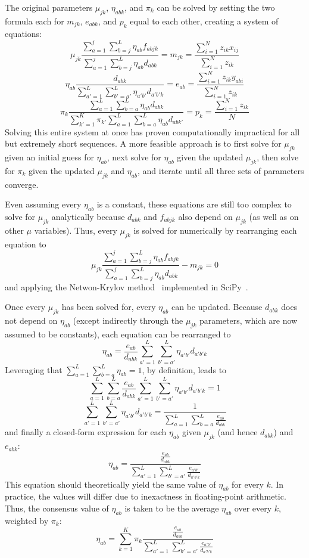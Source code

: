 \documentclass[../../MainTexts/main.tex]{subfiles}
\begin{document}
The original parameters $\mu_{jk}$, $\eta_{abk}$, and $\pi_k$ can be solved by setting the two formula each for $m_{jk}$, $e_{abk}$, and $p_k$ equal to each other, creating a system of equations:
$$\mu_{jk} \frac{\sum_{a=1}^{j}\sum_{b=j}^{L}\eta_{ab} f_{abjk}}{\sum_{a=1}^{j}\sum_{b=j}^{L}\eta_{ab}d_{abk}} = m_{jk} = \frac{\sum_{i=1}^{N} z_{ik} x_{ij}}{\sum_{i=1}^{N} z_{ik}}$$
$$\eta_{ab} \frac{d_{abk}}{\sum_{a'=1}^{L} \sum_{b'=a'}^{L} \eta_{a'b'} d_{a'b'k}} = e_{ab} = \frac{\sum_{i=1}^{N} z_{ik} y_{abi}}{\sum_{i=1}^{N} z_{ik}}$$
$$\pi_k \frac{\sum_{a=1}^{L} \sum_{b=a}^{L} \eta_{ab} d_{abk}}{\sum_{k'=1}^{K} \pi_{k'} \sum_{a=1}^{L} \sum_{b=a}^{L} \eta_{ab} d_{abk'}} = p_k = \frac{\sum_{i=1}^{N} z_{ik}}{N}$$
Solving this entire system at once has proven computationally impractical for all but extremely short sequences.
A more feasible approach is to first solve for $\mu_{jk}$ given an initial guess for $\eta_{ab}$, next solve for $\eta_{ab}$ given the updated $\mu_{jk}$, then solve for $\pi_k$ given the updated $\mu_{jk}$ and $\eta_{ab}$, and iterate until all three sets of parameters converge.

Even assuming every $\eta_{ab}$ is a constant, these equations are still too complex to solve for $\mu_{jk}$ analytically because $d_{abk}$ and $f_{abjk}$ also depend on $\mu_{jk}$ (as well as on other $\mu$ variables).
Thus, every $\mu_{jk}$ is solved for numerically by rearranging each equation to
$$\mu_{jk} \frac{\sum_{a=1}^{j}\sum_{b=j}^{L}\eta_{ab} f_{abjk}}{\sum_{a=1}^{j}\sum_{b=j}^{L}\eta_{ab}d_{abk}} - m_{jk} = 0$$
and applying the Netwon-Krylov method~\cite{Knoll2004} implemented in SciPy~\cite{Virtanen2020}.

Once every $\mu_{jk}$ has been solved for, every $\eta_{ab}$ can be updated.
Because $d_{abk}$ does not depend on $\eta_{ab}$ (except indirectly through the $\mu_{jk}$ parameters, which are now assumed to be constants), each equation can be rearranged to
$$\eta_{ab} = \frac{e_{ab}}{d_{abk}} \sum_{a'=1}^{L} \sum_{b'=a'}^{L} \eta_{a'b'} d_{a'b'k}$$
Leveraging that $\sum_{a=1}^{L} \sum_{b=a}^{L} \eta_{ab} = 1$, by definition, leads to
$$\sum_{a=1}^{L} \sum_{b=a}^{L} \frac{e_{ab}}{d_{abk}} \sum_{a'=1}^{L} \sum_{b'=a'}^{L} \eta_{a'b'} d_{a'b'k} = 1$$
$$\sum_{a'=1}^{L} \sum_{b'=a'}^{L} \eta_{a'b'} d_{a'b'k} = \frac{1}{\sum_{a=1}^{L} \sum_{b=a}^{L} \frac{e_{ab}}{d_{abk}}}$$
and finally a closed-form expression for each $\eta_{ab}$ given $\mu_{jk}$ (and hence $d_{abk}$) and $e_{abk}$:
$$\eta_{ab} = \frac{\frac{e_{ab}}{d_{abk}}}{\sum_{a'=1}^{L} \sum_{b'=a'}^{L} \frac{e_{a'b'}}{d_{a'b'k}}}$$
This equation should theoretically yield the same value of $\eta_{ab}$ for every $k$.
In practice, the values will differ due to inexactness in floating-point arithmetic.
Thus, the consensus value of $\eta_{ab}$ is taken to be the average $\eta_{ab}$ over every $k$, weighted by $\pi_k$:
$$\eta_{ab} = \sum_{k=1}^{K} \pi_k \frac{\frac{e_{ab}}{d_{abk}}}{\sum_{a'=1}^{L} \sum_{b'=a'}^{L} \frac{e_{a'b'}}{d_{a'b'k}}}$$
\end{document}

